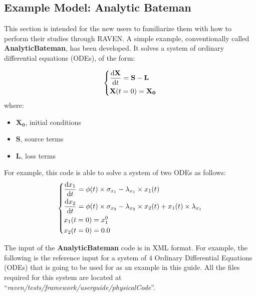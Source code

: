 \subsection{Example Model: Analytic Bateman}\label{sec:analyticalbateman}
This section is intended for the new users to familiarize them with how to perform their studies through RAVEN.
A simple example, conventionally called \textbf{AnalyticBateman}, has been developed. It solves a system of
ordinary differential equations (ODEs), of the form:

\begin{equation}
\begin{dcases}
\frac{\mathrm{d} \mathbf{X}}{\mathrm{d} t} = \mathbf{S}-\mathbf{L} \\
 \mathbf{X}(t=0)= \mathbf{X_{0}}
\end{dcases}
\end{equation}
   where:
  \begin{itemize}
     \item $\mathbf{X_{0}}$, initial conditions
     \item $\mathbf{S}$, source terms
     \item $\mathbf{L}$, loss terms
   \end{itemize}

For example, this  code is able to solve a system of two ODEs as follows:
\begin{equation}
  \begin{dcases}
    \frac{\mathrm{d} x_{1}}{\mathrm{d} t} = \phi (t)\times \sigma_{x_{1}}-\lambda_{x_{1}}\times x_{1}(t) \\
    \frac{\mathrm{d} x_{2}}{\mathrm{d} t} = \phi (t)\times \sigma_{x_{2}}-\lambda_{x_{2}} \times x_{2}(t) + x_{1}(t)\times\lambda_{x_{1}} \\
    x_{1}(t=0)= x_{1}^{0} \\
    x_{2}(t=0)= 0.0
  \end{dcases}
\end{equation}

The input of the \textbf{AnalyticBateman} code is in XML format.
For example, the following is the reference input for a system of 4 Ordinary Differential Equations (ODEs)
that is going to be used for as an example in this guide. All the files required for this system are  located at
``\textit{raven/tests/framework/user\textunderscore guide/physicalCode}''. 

